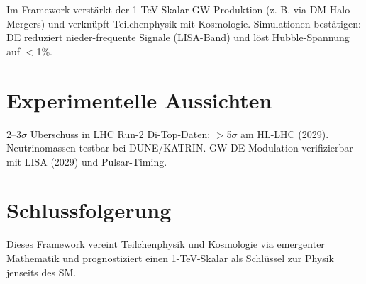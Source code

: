 \documentclass[11pt,a4paper]{article}
\begin{document}
	Im Framework verst{\"a}rkt der 1-TeV-Skalar GW-Produktion (z. B. via DM-Halo-Mergers) und verkn{\"u}pft Teilchenphysik mit Kosmologie. Simulationen best{\"a}tigen: DE reduziert nieder-frequente Signale (LISA-Band) und l{\"o}st Hubble-Spannung auf $<$1\%.
	
	
	\section{Experimentelle Aussichten}
	2--3$\sigma$ {\"U}berschuss in LHC Run-2 Di-Top-Daten; $>$5$\sigma$ am HL-LHC (2029). Neutrinomassen testbar bei DUNE/KATRIN. GW-DE-Modulation verifizierbar mit LISA (2029) und Pulsar-Timing.
	
	\section{Schlussfolgerung}
	Dieses Framework vereint Teilchenphysik und Kosmologie via emergenter Mathematik und prognostiziert einen 1-TeV-Skalar als Schl{\"u}ssel zur Physik jenseits des SM.
	
	
	
	
\end{document}
